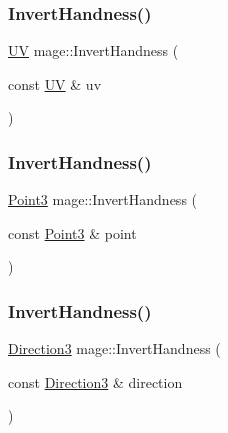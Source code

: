 \subsubsection{\texorpdfstring{Invert\+Handness()}{InvertHandness()}\hspace{0.1cm}{\footnotesize\ttfamily [1/4]}}
{\footnotesize\ttfamily \hyperlink{structmage_1_1_u_v}{UV} mage\+::\+Invert\+Handness (\begin{DoxyParamCaption}\item[{const \hyperlink{structmage_1_1_u_v}{UV} \&}]{uv }\end{DoxyParamCaption})}

\hypertarget{namespacemage_a20ded71f51e2014bab8e7d232eaf1c29}{}\label{namespacemage_a20ded71f51e2014bab8e7d232eaf1c29} 
\subsubsection{\texorpdfstring{Invert\+Handness()}{InvertHandness()}\hspace{0.1cm}{\footnotesize\ttfamily [2/4]}}
{\footnotesize\ttfamily \hyperlink{structmage_1_1_point3}{Point3} mage\+::\+Invert\+Handness (\begin{DoxyParamCaption}\item[{const \hyperlink{structmage_1_1_point3}{Point3} \&}]{point }\end{DoxyParamCaption})}

\hypertarget{namespacemage_a1d236e395736f7b5e28e52ccd3d643ae}{}\label{namespacemage_a1d236e395736f7b5e28e52ccd3d643ae} 
\subsubsection{\texorpdfstring{Invert\+Handness()}{InvertHandness()}\hspace{0.1cm}{\footnotesize\ttfamily [3/4]}}
{\footnotesize\ttfamily \hyperlink{structmage_1_1_direction3}{Direction3} mage\+::\+Invert\+Handness (\begin{DoxyParamCaption}\item[{const \hyperlink{structmage_1_1_direction3}{Direction3} \&}]{direction }\end{DoxyParamCaption})}

\hypertarget{namespacemage_a437458a2e3278f106da66534c5218e4e}{}\label{namespacemage_a437458a2e3278f106da66534c5218e4e} 
